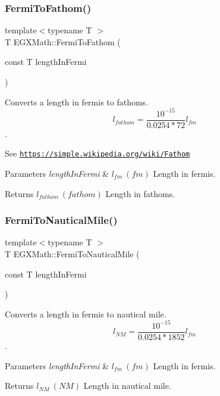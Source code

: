 \subsubsection{\texorpdfstring{Fermi\+To\+Fathom()}{FermiToFathom()}}
{\footnotesize\ttfamily template$<$typename T $>$ \\
T E\+G\+X\+Math\+::\+Fermi\+To\+Fathom (\begin{DoxyParamCaption}\item[{const T}]{length\+In\+Fermi }\end{DoxyParamCaption})}



Converts a length in fermis to fathoms. \[ l_{fathom}= \frac{10^{-15}}{0.0254 * 72} l_{fm} \]. 

See \href{https://simple.wikipedia.org/wiki/Fathom}{\tt https\+://simple.\+wikipedia.\+org/wiki/\+Fathom} 
\begin{DoxyParams}{Parameters}
{\em length\+In\+Fermi} & $ l_{fm}\ (fm)$ Length in fermis. \\
\hline
\end{DoxyParams}
\begin{DoxyReturn}{Returns}
$ l_{fathom}\ (fathom)$ Length in fathoms. 
\end{DoxyReturn}
\mbox{\label{group___e_g_x_math-_conversions-_length_conversions-_non-_s_i-_fermi-_nautical_gac5966592cf227d0a5aa87ead6a4ca7d8}} 
\subsubsection{\texorpdfstring{Fermi\+To\+Nautical\+Mile()}{FermiToNauticalMile()}}
{\footnotesize\ttfamily template$<$typename T $>$ \\
T E\+G\+X\+Math\+::\+Fermi\+To\+Nautical\+Mile (\begin{DoxyParamCaption}\item[{const T}]{length\+In\+Fermi }\end{DoxyParamCaption})}



Converts a length in fermis to nautical mile. \[ l_{NM}= \frac{10^{-15}}{0.0254 * 1852} l_{fm} \]. 


\begin{DoxyParams}{Parameters}
{\em length\+In\+Fermi} & $ l_{fm}\ (fm)$ Length in fermis. \\
\hline
\end{DoxyParams}
\begin{DoxyReturn}{Returns}
$ l_{NM}\ (NM)$ Length in nautical mile. 
\end{DoxyReturn}

